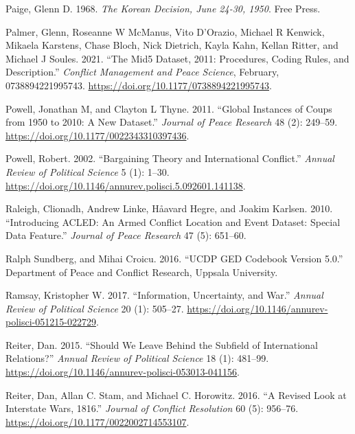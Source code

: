 \documentclass{article}
\newlength{\cslhangindent}
\newlength{\cslentryspacingunit} %
\newenvironment{CSLReferences}[2] %
 {%
  \setlength{\parindent}{0pt}
  \ifodd #1
  \let\oldpar\par
  \def\par{\hangindent=\cslhangindent\oldpar}
  \fi
  \setlength{\parskip}{#2\cslentryspacingunit}
 }%
 {}
\begin{document}
\begin{CSLReferences}{1}{0}
\leavevmode{}%
Paige, Glenn D. 1968. \emph{The {Korean Decision}, {June} 24-30, 1950}.
{Free Press}.

\leavevmode{}%
Palmer, Glenn, Roseanne W McManus, Vito D'Orazio, Michael R Kenwick,
Mikaela Karstens, Chase Bloch, Nick Dietrich, Kayla Kahn, Kellan Ritter,
and Michael J Soules. 2021. {``The {Mid5 Dataset}, 2011:
{Procedures}, Coding Rules, and Description.''} \emph{Conflict
Management and Peace Science}, February, 0738894221995743.
\url{https://doi.org/10.1177/0738894221995743}.

\leavevmode{}%
Powell, Jonathan M, and Clayton L Thyne. 2011. {``Global Instances of
Coups from 1950 to 2010: {A} New Dataset.''} \emph{Journal of Peace
Research} 48 (2): 249--59.
\url{https://doi.org/10.1177/0022343310397436}.

\leavevmode{}%
Powell, Robert. 2002. {``Bargaining {Theory} and {International
Conflict}.''} \emph{Annual Review of Political Science} 5 (1): 1--30.
\url{https://doi.org/10.1146/annurev.polisci.5.092601.141138}.

\leavevmode{}%
Raleigh, Clionadh, Andrew Linke, Håavard Hegre, and Joakim Karlsen.
2010. {``Introducing {ACLED}: An Armed Conflict Location and Event
Dataset: Special Data Feature.''} \emph{Journal of Peace Research} 47
(5): 651--60.

\leavevmode{}%
Ralph Sundberg, and Mihai Croicu. 2016. {``{UCDP GED Codebook} Version
5.0.''} {Department of Peace and Conflict Research, Uppsala University}.

\leavevmode{}%
Ramsay, Kristopher W. 2017. {``Information, {Uncertainty}, and {War}.''}
\emph{Annual Review of Political Science} 20 (1): 505--27.
\url{https://doi.org/10.1146/annurev-polisci-051215-022729}.

\leavevmode{}%
Reiter, Dan. 2015. {``Should {We Leave Behind} the {Subfield} of
{International Relations}?''} \emph{Annual Review of Political Science}
18 (1): 481--99.
\url{https://doi.org/10.1146/annurev-polisci-053013-041156}.

\leavevmode{}%
Reiter, Dan, Allan C. Stam, and Michael C. Horowitz. 2016. {``A {Revised
Look} at {Interstate Wars}, 1816.''} \emph{Journal of
Conflict Resolution} 60 (5): 956--76.
\url{https://doi.org/10.1177/0022002714553107}.


\end{CSLReferences}
\end{document}
